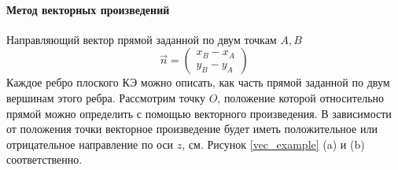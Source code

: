 \paragraph{Метод векторных произведений}
Направляющий вектор прямой заданной по двум точкам $A,B$
\begin{equation*}
	\vec{n} = \begin{pmatrix}
		x_B-x_A\\
		y_B-y_A
	\end{pmatrix}
\end{equation*}
Каждое ребро плоского КЭ можно описать, как часть прямой заданной по двум вершинам этого ребра. Рассмотрим точку $O$, положение которой относительно прямой можно определить с помощью векторного произведения. В зависимости от положения точки векторное произведение будет иметь положительное или отрицательное направление по оси $z$, см. Рисунок \ref{vec_example} (a) и (b) соответственно.
